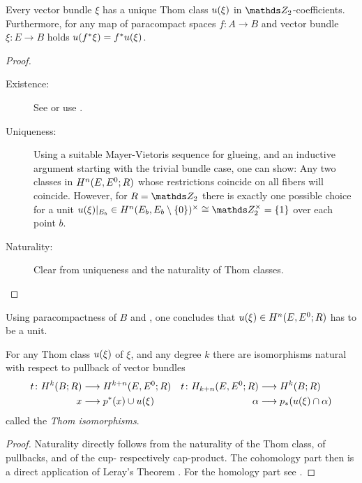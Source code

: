\begin{Thm}
  Every vector bundle $\xi$ has a unique Thom class $u(\xi)$ in
  $\Zmod2$-coefficients.
  Furthermore, for any map of paracompact spaces $f\colon A\to B$ and
  vector bundle $\xi\colon E\to B$ holds $u({f}^* \xi) = {f}^* u(\xi)$.
  \begin{proof}
    \begin{description}
    \item[Existence:] See \cite[Theorem~4D.10]{hatcher} or use
      \cite[Proposition~17.9.3]{tomdieck}.
    \item[Uniqueness:] %
      Using a suitable Mayer-Vietoris sequence for glueing, and an
      inductive argument starting with the trivial bundle case, one can show:
      Any two classes in $H^n(E, {E}^0;R)$ whose
      restrictions coincide on all fibers will coincide.
      However, for $R=\Zmod2$ there is exactly one possible choice for
      a unit $\u(\xi)|_{E_b}\in
      H^n(\spherepair{E_b})^\times\cong\Zmod2^\times=\{1\}$
      over each point $b$.
    \item[Naturality:] Clear from uniqueness and the naturality of Thom classes.
    \end{description}
  \end{proof}
\end{Thm}

\begin{Rem}
  Using paracompactness of $B$ and
  \cite[Proposition~17.9.6]{tomdieck}, one concludes that
  $u(\xi)\in H^n(E, {E}^0;R)$ has to be a unit.
\end{Rem}

\begin{Thm}
  For any Thom class $u(\xi)$ of $\xi$, and any degree $k$ there are
  isomorphisms natural with respect to pullback of vector bundles
  \begin{align*}
    t\colon
    H^k(B;R) &\longrightarrow H^{k+n}(E, {E}^0; R)
    & t\colon
      H_{k+n}(E, {E}^0; R) &\longrightarrow H^k(B;R)
    \\
    x &\longrightarrow {p}^* (x) \cup u(\xi)
    & \alpha &\longrightarrow {p}_* (u(\xi) \cap \alpha)
  \end{align*}
  called the \emph{Thom isomorphisms}.
  \begin{proof}
    Naturality directly follows from the naturality of the Thom class,
    of pullbacks, and of the cup- respectively cap-product.
    The cohomology part then is a direct application of Leray's Theorem
    \cite[Theorem~4D.8]{hatcher}.
    For the homology part see \forexample \cite[Theorem~14.6]{switzer}.
  \end{proof}
\end{Thm}

